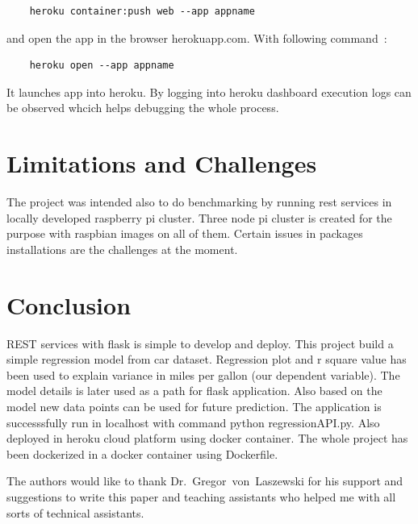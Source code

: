 \begin{verbatim}
    heroku container:push web --app appname
\end{verbatim}

 and open the app in the browser herokuapp.com. With following
 command~\cite{hid-sp18-415-heroku-com}:

\begin{verbatim}
    heroku open --app appname
\end{verbatim}

 It launches app into heroku. By logging into heroku dashboard
 execution logs can be observed whcich helps debugging the whole
 process.
 
\section{Limitations and Challenges}
 
The project was intended also to do benchmarking by running rest services in
locally developed raspberry pi cluster. Three node pi cluster is created 
for the purpose with raspbian images on all of them. Certain issues in packages 
installations are the challenges at the moment.

\section{Conclusion}

REST services with flask is simple to develop and deploy. 
This project build a
simple regression model from car dataset. Regression plot and r square
value has been used to explain variance in miles per gallon (our dependent
variable). The model details is later used as 
a path for flask application. Also based on the model new data points can be 
used for future prediction. The application is successsfully run in localhost
with command python regressionAPI.py. Also deployed in heroku cloud platform 
using docker container. The whole project has been dockerized in
a docker container using Dockerfile. 




\begin{acks}

  The authors would like to thank Dr.~Gregor~von~Laszewski for his
  support and suggestions to write this paper and teaching assistants who
  helped me with all sorts of technical assistants.

\end{acks}




 
